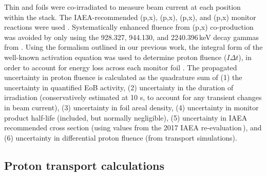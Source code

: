 Thin  and  foils  
were co-irradiated to measure beam current at each position within the stack.
The IAEA-recommended (p,x), (p,x),  (p,x), and (p,x) monitor reactions were used 
\cite{Hermanne2018}.
Systematically enhanced fluence from (p,x) co-production was avoided by only using the 928.327, 944.130, and 2240.396\,keV decay gammas  from .
Using the formalism outlined in our previous work, the integral form of the well-known activation equation was used to  determine proton fluence ($I \Delta t $),
in order to account for energy loss across each monitor foil \cite{Voyles2018a}.
The propagated uncertainty in proton fluence is calculated as the quadrature sum of (1) the uncertainty in quantified EoB activity, (2) uncertainty in the duration of irradiation (conservatively estimated at 10 s, to account for any transient changes in beam current), (3) uncertainty in foil areal density, (4) uncertainty in monitor product half-life (included, but normally negligible), (5) uncertainty in IAEA recommended cross section (using values  from the 2017 IAEA re-evaluation\,\cite{Hermanne2018}), and (6) uncertainty in differential proton fluence (from transport simulations).





\subsection{\label{sec:proton_transport_U5_d}Proton transport calculations}

